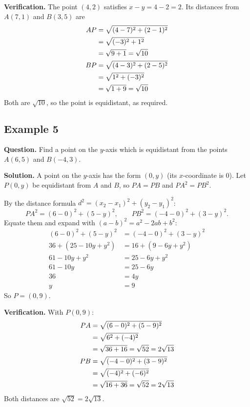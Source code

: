 \textbf{Verification.} The point $(4,2)$ satisfies $x-y=4-2=2$. Its distances from $A(7,1)$ and $B(3,5)$ are
\begin{align*}
\distn{AP}{7}{1}{4}{2}\\
\distn{BP}{3}{5}{4}{2}
\end{align*}
Both are $\sqrt{10}$, so the point is equidistant, as required.


\subsection*{Example 5}
\textbf{Question.} Find a point on the $y$-axis which is equidistant from the points $A(6,5)$ and $B(-4,3)$.

\textbf{Solution.} A point on the $y$-axis has the form $(0,y)$ (its $x$-coordinate is $0$). Let $P(0,y)$ be equidistant from $A$ and $B$, so $PA=PB$ and $PA^2=PB^2$.

By the distance formula $d^2=(x_2-x_1)^2+(y_2-y_1)^2$:
\[
PA^2=(6-0)^2+(5-y)^2,\qquad PB^2=(-4-0)^2+(3-y)^2 .
\]
Equate them and expand with $(a-b)^2=a^2-2ab+b^2$:
\begin{align*}
(6-0)^2+(5-y)^2&=(-4-0)^2+(3-y)^2\\
36+(25-10y+y^2)&=16+(9-6y+y^2)\\
61-10y+y^2&=25-6y+y^2\\
61-10y&=25-6y\\
36&=4y\\
y&=9
\end{align*}
So $P=(0,9)$.

\textbf{Verification.} With $P(0,9)$:
\begin{align*}
\dist{PA}{0}{9}{6}{5}{2\sqrt{13}}\\
\dist{PB}{0}{9}{-4}{3}{2\sqrt{13}}
\end{align*}
Both distances are $\sqrt{52}=2\sqrt{13}$.


